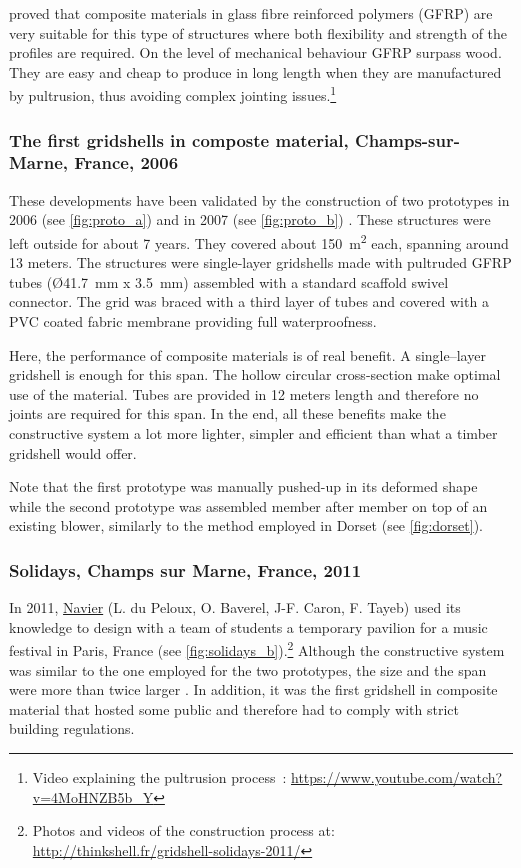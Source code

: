 \citet{Douthe2010a} proved that composite materials in glass fibre reinforced polymers (GFRP) are very suitable for this type of structures where both flexibility and strength of the profiles are required. On the level of mechanical behaviour GFRP surpass wood. They are easy and cheap to produce in long length when they are manufactured by pultrusion, thus avoiding complex jointing issues.\footnote{Video explaining the pultrusion process~: \url{https://www.youtube.com/watch?v=4MoHNZB5b_Y}}

\subsubsection{The first gridshells in composte material, Champs-sur-Marne, France, 2006}
\label{sec=proto}
These developments have been validated by the construction of two prototypes in 2006 (see \cref{fig:proto_a}) and in 2007 (see \ref{fig:proto_b}) \cite{Douthe2006}. These structures were left outside for about 7 years. They covered about \SI{150}{m^2} each, spanning around 13 meters. The structures were single-layer gridshells made with pultruded GFRP tubes (\O \SI{41.7}{mm} x \SI{3.5}{mm}) assembled with a standard scaffold swivel connector. The grid was braced with a third layer of tubes and covered with a PVC coated fabric membrane providing full waterproofness.

Here, the performance of composite materials is of real benefit. A single--layer gridshell is enough for this span. The hollow circular cross-section make optimal use of the material. Tubes are provided in 12 meters length and therefore no joints are required for this span. In the end, all these benefits make the constructive system a lot more lighter, simpler and efficient than what a timber gridshell would offer.

Note that the first prototype was manually pushed-up in its deformed shape while the second prototype was assembled member after member on top of an existing blower, similarly to the method employed in Dorset (see \cref{fig:dorset}).

\subsubsection{Solidays, Champs sur Marne, France, 2011}
In 2011, \href{http://navier.enpc.fr}{Navier} (L. du Peloux, O. Baverel, J-F. Caron, F. Tayeb) used its knowledge to design with a team of students a temporary pavilion for a music festival in Paris, France (see \cref{fig:solidays_b}).\footnote{Photos and videos of the construction process at: \url{ http://thinkshell.fr/gridshell-solidays-2011/}} Although the constructive system was similar to the one employed for the two prototypes, the size and the span were more than twice larger \cite{Baverel2012}. In addition, it was the first gridshell in composite material that hosted some public and therefore had to comply with strict building regulations.

